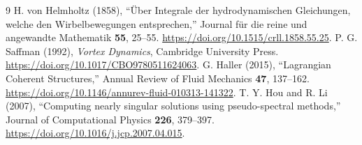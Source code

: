 \begin{thebibliography}{9}
 H. von Helmholtz (1858),
``\"Uber Integrale der hydrodynamischen Gleichungen, welche den Wirbelbewegungen entsprechen,''
Journal f\"ur die reine und angewandte Mathematik \textbf{55}, 25--55.
\url{https://doi.org/10.1515/crll.1858.55.25}.
 P. G. Saffman (1992),
\textit{Vortex Dynamics}, Cambridge University Press.
\url{https://doi.org/10.1017/CBO9780511624063}.
 G. Haller (2015),
``Lagrangian Coherent Structures,'' Annual Review of Fluid Mechanics \textbf{47}, 137--162.
\url{https://doi.org/10.1146/annurev-fluid-010313-141322}.
 T. Y. Hou and R. Li (2007),
``Computing nearly singular solutions using pseudo-spectral methods,''
Journal of Computational Physics \textbf{226}, 379--397.
\url{https://doi.org/10.1016/j.jcp.2007.04.015}.
\end{thebibliography}
